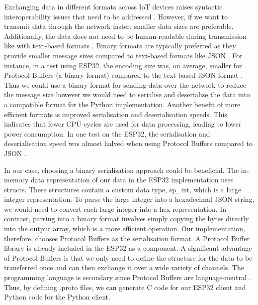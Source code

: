 Exchanging data in different formats across \ac{IoT} devices raises syntactic interoperability issues that need to be addressed \cite[17]{protocols}. However, if we want to transmit data through the network faster, smaller data sizes are preferable. Additionally, the data does not need to be human-readable during transmission like with text-based formats \cite[225]{protobuffer}. Binary formats are typically preferred as they provide smaller message sizes compared to text-based formats like JSON \cite[11]{serialisation}. For instance, in a test using ESP32, the encoding size was, on average, smaller for Protocol Buffers (a binary format) compared to the text-based JSON format \cite[15]{serialisation-comparison}. Thus we could use a binary format for sending data over the network to reduce the message size however we would need to serialise and deserialise the data into a compatible format for the Python implementation. Another benefit of more efficient formats is improved serialisation and deserialisation speeds. This indicates that fewer CPU cycles are used for data processing, leading to lower power consumption. In one test on the ESP32, the serialisation and deserialisation speed was almost halved when using Protocol Buffers compared to JSON \cite[11-12]{serialisation-comparison}. 

In our case, choosing a binary serialisation approach could be beneficial. The in-memory data representation of our data in the ESP32 implementation uses structs. These structures contain a custom data type, sp\_int, which is a large integer representation. To parse the large integer into a hexadecimal JSON string, we would need to convert each large integer into a hex representation. In contrast, parsing into a binary format involves simply copying the bytes directly into the output array, which is a more efficient operation. Our implementation, therefore, chooses Protocol Buffers as the serialisation format. A Protocol Buffer library is already included in the ESP32 as a component. A significant advantage of Protocol Buffers is that we only need to define the structure for the data to be transferred once and can then exchange it over a wide variety of channels. The programming language is secondary since Protocol Buffers are language-neutral \cite[224]{protobuffer}. Thus, by defining .proto files, we can generate C code for our ESP32 client and Python code for the Python client.

